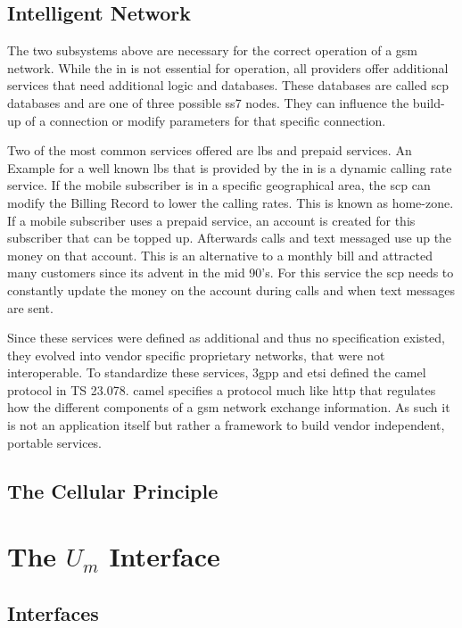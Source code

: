\subsection{Intelligent Network}
The two subsystems above are necessary for the correct operation of a \gls{gsm} network.
While the \gls{in} is not essential for operation, all providers offer additional services that need additional logic and databases.
These databases are called \gls{scp} databases and are one of three possible \gls{ss7} nodes.
They can influence the build-up of a connection or modify parameters for that specific connection.

Two of the most common services offered are \gls{lbs} and prepaid services.
An Example for a well known \gls{lbs} that is provided by the \gls{in} is a dynamic calling rate service.
If the mobile subscriber is in a specific geographical area, the \gls{scp} can modify the Billing Record to lower the calling rates.
This is known as home-zone.
If a mobile subscriber uses a prepaid service, an account is created for this subscriber that can be topped up.
Afterwards calls and text messaged use up the money on that account.
This is an alternative to a monthly bill and attracted many customers since its advent in the mid 90's.
For this service the \gls{scp} needs to constantly update the money on the account during calls and when text messages are sent.

Since these services were defined as additional and thus no specification existed, they evolved into vendor specific proprietary networks, that were not interoperable.
To standardize these services, \gls{3gpp} and \gls{etsi} defined the \gls{camel} protocol in TS 23.078\cite{GSM23078}.
\gls{camel} specifies a protocol much like \gls{http} that regulates how the different components of a \gls{gsm} network exchange information.
As such it is not an application itself but rather a framework to build vendor independent, portable services.

\subsection{The Cellular Principle}
\section{The $U_m$ Interface}
\label{sec:Um}
\subsection{Interfaces}
\label{sec:interfaces}
